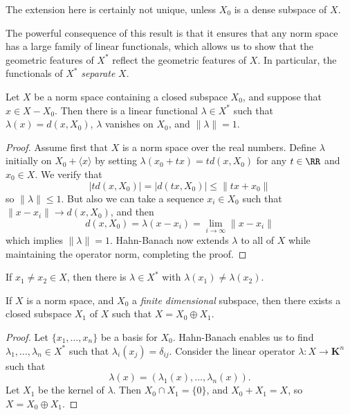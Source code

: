 \begin{remark}
    The extension here is certainly not unique, unless $X_0$ is a dense subspace of $X$.
\end{remark}

The powerful consequence of this result is that it ensures that any norm space has a large family of linear functionals, which allows us to show that the geometric features of $X^*$ reflect the geometric features of $X$. In particular, the functionals of $X^*$ \emph{separate} $X$.

\begin{theorem}
    Let $X$ be a norm space containing a closed subspace $X_0$, and suppose that $x \in X - X_0$. Then there is a linear functional $\lambda \in X^*$ such that $\lambda(x) = d(x,X_0)$, $\lambda$ vanishes on $X_0$, and $\| \lambda \| = 1$.
\end{theorem}
\begin{proof}
    Assume first that $X$ is a norm space over the real numbers. Define $\lambda$ initially on $X_0 + \langle x \rangle$ by setting $\lambda(x_0 + tx) = t d(x,X_0)$ for any $t \in \RR$ and $x_0 \in X$. We verify that
    \[ | t d(x,X_0)| = |d(tx, X_0)| \leq \| tx + x_0 \| \]
    so $\| \lambda \| \leq 1$. But also we can take a sequence $x_i \in X_0$ such that $\| x - x_i \| \to d(x,X_0)$, and then
    \[ d(x,X_0) = \lambda(x - x_i) = \lim_{i \to \infty} \| x - x_i \| \]
    which implies $\| \lambda \| = 1$. Hahn-Banach now extends $\lambda$ to all of $X$ while maintaining the operator norm, completing the proof.
\end{proof}

\begin{corollary}
    If $x_1 \neq x_2 \in X$, then there is $\lambda \in X^*$ with $\lambda(x_1) \neq \lambda(x_2)$.
\end{corollary}

\begin{corollary}
    If $X$ is a norm space, and $X_0$ a \emph{finite dimensional} subspace, then there exists a closed subspace $X_1$ of $X$ such that $X = X_0 \oplus X_1$.
\end{corollary}
\begin{proof}
    Let $\{ x_1, \dots, x_n \}$ be a basis for $X_0$. Hahn-Banach enables us to find $\lambda_1,\dots,\lambda_n \in X^*$ such that $\lambda_i(x_j) = \delta_{ij}$. Consider the linear operator $\lambda: X \to \mathbf{K}^n$ such that
    \[ \lambda(x) = (\lambda_1(x), \dots, \lambda_n(x)). \]
    Let $X_1$ be the kernel of $\lambda$. Then $X_0 \cap X_1 = \{ 0 \}$, and $X_0 + X_1 = X$, so $X = X_0 \oplus X_1$.
\end{proof}

